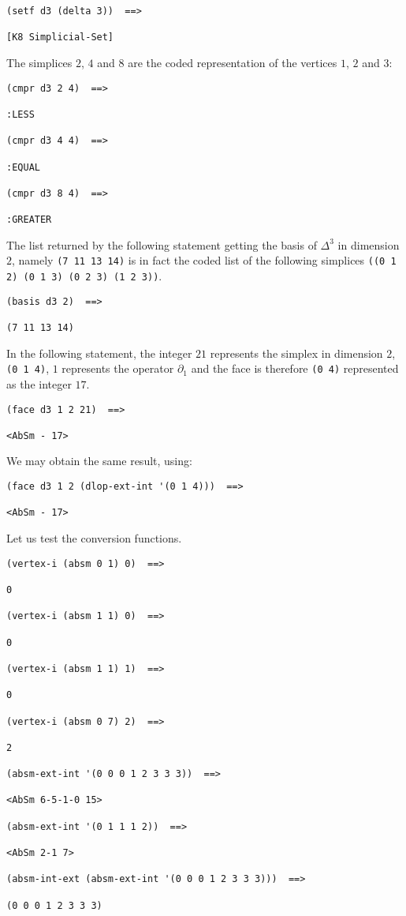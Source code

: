 {\footnotesize\begin{verbatim}
(setf d3 (delta 3))  ==>

[K8 Simplicial-Set]
\end{verbatim}}
The simplices $2$, $4$ and  $8$ are the coded representation of the vertices $1$, $2$ and $3$:
{\footnotesize\begin{verbatim}
(cmpr d3 2 4)  ==>

:LESS

(cmpr d3 4 4)  ==>

:EQUAL

(cmpr d3 8 4)  ==>

:GREATER
\end{verbatim}}
The list returned by the following statement  getting the basis of $\Delta^3$ in
dimension $2$, namely {\tt (7 11 13 14)} is in fact the coded list
of the following simplices {\tt ((0 1 2) (0 1 3) (0 2 3) (1 2 3))}.
{\footnotesize\begin{verbatim}
(basis d3 2)  ==>

(7 11 13 14)
\end{verbatim}}
In the following statement,
the integer $21$ represents the simplex in dimension $2$, {\tt (0 1 4)}, $1$ represents the operator $\partial_1$
and the face is therefore {\tt (0 4)} represented as the integer $17$.
{\footnotesize\begin{verbatim}
(face d3 1 2 21)  ==>

<AbSm - 17>
\end{verbatim}}
We may obtain the same result, using:
{\footnotesize\begin{verbatim}
(face d3 1 2 (dlop-ext-int '(0 1 4)))  ==>

<AbSm - 17>
\end{verbatim}}
Let us test the conversion functions.
{\footnotesize\begin{verbatim}
(vertex-i (absm 0 1) 0)  ==>

0

(vertex-i (absm 1 1) 0)  ==>

0

(vertex-i (absm 1 1) 1)  ==>

0

(vertex-i (absm 0 7) 2)  ==>

2

(absm-ext-int '(0 0 0 1 2 3 3 3))  ==>

<AbSm 6-5-1-0 15>

(absm-ext-int '(0 1 1 1 2))  ==>

<AbSm 2-1 7>

(absm-int-ext (absm-ext-int '(0 0 0 1 2 3 3 3)))  ==>

(0 0 0 1 2 3 3 3)
\end{verbatim}}
